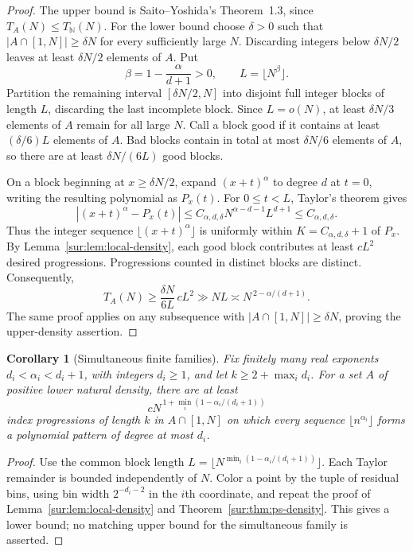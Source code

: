 \documentclass[11pt,a4paper]{article}
\newtheorem{corollary}[theorem]{Corollary}
\theoremstyle{definition}
\theoremstyle{remark}
\numberwithin{equation}{section}
\begin{document}
\begin{proof}
The upper bound is Saito--Yoshida's Theorem~1.3, since
$T_A(N)\leq T_{\mathbb N}(N)$. For the lower bound choose $\delta>0$
such that $|A\cap[1,N]|\geq\delta N$ for every sufficiently large $N$.
Discarding integers below $\delta N/2$ leaves at least $\delta N/2$
elements of $A$. Put
\[
 \beta=1-\frac{\alpha}{d+1}>0,
 \qquad L=\lfloor N^\beta\rfloor.
\]
Partition the remaining interval $[\delta N/2,N]$ into disjoint full
integer blocks of length $L$, discarding the last incomplete block.
Since $L=o(N)$, at least $\delta N/3$ elements of $A$ remain for all
large $N$. Call a block good if it contains at least $(\delta/6)L$
elements of $A$. Bad blocks contain in total at most $\delta N/6$
elements of $A$, so there are at least $\delta N/(6L)$ good blocks.

On a block beginning at $x\geq\delta N/2$, expand $(x+t)^\alpha$ to
degree $d$ at $t=0$, writing the resulting polynomial as $P_x(t)$.
For $0\leq t<L$, Taylor's theorem gives
\[
 |(x+t)^\alpha-P_x(t)|
 \leq C_{\alpha,d,\delta}
 N^{\alpha-d-1}L^{d+1}
 \leq C_{\alpha,d,\delta}.
\]
Thus the integer sequence $\lfloor(x+t)^\alpha\rfloor$ is uniformly
within $K=C_{\alpha,d,\delta}+1$ of $P_x$. By
Lemma~\ref{sur:lem:local-density}, each good block contributes at least
$cL^2$ desired progressions. Progressions counted in distinct blocks
are distinct. Consequently,
\[
 T_A(N)\geq\frac{\delta N}{6L}\,cL^2
 \gg NL\asymp N^{\,2-\alpha/(d+1)}.
\]
The same proof applies on any subsequence with
$|A\cap[1,N]|\geq\delta N$, proving the upper-density assertion.
\end{proof}

\begin{corollary}[Simultaneous finite families]\label{sur:cor:ps-simultaneous}
Fix finitely many real exponents $d_i<\alpha_i<d_i+1$, with integers
$d_i\geq1$, and let $k\geq2+\max_i d_i$. For a set $A$ of positive
lower natural density, there are at least
\[
 cN^{\,1+\min_i(1-\alpha_i/(d_i+1))}
\]
index progressions of length $k$ in $A\cap[1,N]$ on which every sequence
$\lfloor n^{\alpha_i}\rfloor$ forms a polynomial pattern of degree at
most $d_i$.
\end{corollary}

\begin{proof}
Use the common block length
$L=\lfloor N^{\min_i(1-\alpha_i/(d_i+1))}\rfloor$.
Each Taylor remainder is bounded independently of $N$. Color a point
by the tuple of residual bins, using bin width $2^{-d_i-2}$ in the
$i$th coordinate, and repeat the proof of
Lemma~\ref{sur:lem:local-density} and Theorem~\ref{sur:thm:ps-density}.
This gives a lower bound; no matching upper bound for the simultaneous
family is asserted.
\end{proof}
\end{document}
